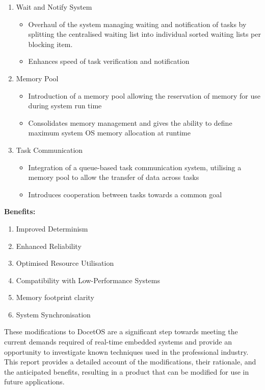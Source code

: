 \begin{enumerate}
	\item Wait and Notify System
	\begin{itemize}
		\item Overhaul of the system managing waiting and notification of tasks by splitting the centralised waiting list into individual sorted waiting lists per blocking item.
		\item Enhances speed of task verification and notification
	\end{itemize}
	
	\item Memory Pool
	\begin{itemize}
		\item Introduction of a memory pool allowing the reservation of memory for use during system run time
		\item Consolidates memory management and gives the ability to define maximum system OS memory allocation at runtime
	\end{itemize}
	
	\item Task Communication
	\begin{itemize}
		\item Integration of a queue-based task communication system, utilising a memory pool to allow the transfer of data across tasks
		\item Introduces cooperation between tasks towards a common goal
	\end{itemize}
	
\end{enumerate}
\textbf{Benefits:}
\begin{enumerate}
	\item Improved Determinism
	\item Enhanced Reliability
	\item Optimised Resource Utilisation
	\item Compatibility with Low-Performance Systems
	\item Memory footprint clarity
	\item System Synchronisation
\end{enumerate}
These modifications to DocetOS are a significant step towards meeting the current demands required of real-time embedded systems and provide an opportunity to investigate known techniques used in the professional industry. This report provides a detailed account of the modifications, their rationale, and the anticipated benefits, resulting in a product that can be modified for use in future applications. \hfill\break